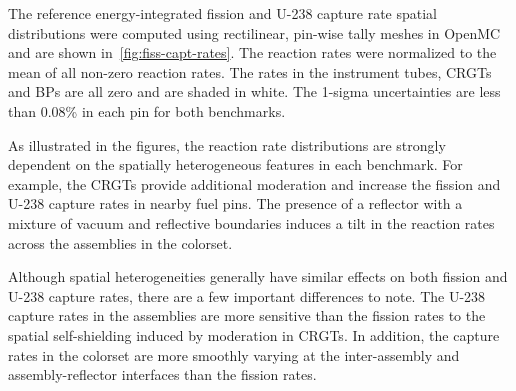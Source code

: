 The reference energy-integrated fission and U-238 capture rate spatial distributions were computed using rectilinear, pin-wise tally meshes in OpenMC and are shown in~\autoref{fig:fiss-capt-rates}. The reaction rates were normalized to the mean of all non-zero reaction rates. The rates in the instrument tubes, CRGTs and BPs are all zero and are shaded in white. The 1-sigma uncertainties are less than 0.08\% in each pin for both benchmarks.


As illustrated in the figures, the reaction rate distributions are strongly dependent on the spatially heterogeneous features in each benchmark. For example, the CRGTs provide additional moderation and increase the fission and U-238 capture rates in nearby fuel pins. The presence of a reflector with a mixture of vacuum and reflective boundaries induces a tilt in the reaction rates across the assemblies in the colorset.

Although spatial heterogeneities generally have similar effects on both fission and U-238 capture rates, there are a few important differences to note. The U-238 capture rates in the assemblies are more sensitive than the fission rates to the spatial self-shielding induced by moderation in CRGTs. In addition, the capture rates in the colorset are more smoothly varying at the inter-assembly and assembly-reflector interfaces than the fission rates.
